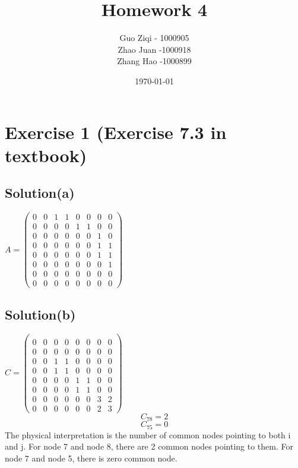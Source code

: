 \documentclass[12pt]{article}%
\begin{document}
\title{Homework 4}
\author{Guo Ziqi - 1000905\\Zhao Juan -1000918 \\Zhang Hao -1000899 }
\date{\today}
\maketitle
\section{Exercise 1 (Exercise 7.3 in textbook)}
\subsection{Solution(a)}
$A = \left(\begin{matrix} 
0&0&1&1&0&0&0&0
\\ 0&0&0&0&1&1&0&0
\\0&0&0&0&0&0&1&0
\\0&0&0&0&0&0&1&1
\\0&0&0&0&0&0&1&1
\\0&0&0&0&0&0&0&1
\\0&0&0&0&0&0&0&0
\\0&0&0&0&0&0&0&0
 \end{matrix}\right)$
\subsection{Solution(b)}
$C = \left(\begin{matrix} 
\\0&0&0&0&0&0&0&0
\\0&0&0&0&0&0&0&0
\\0&0&1&1&0&0&0&0
\\0&0&1&1&0&0&0&0
\\0&0&0&0&1&1&0&0
\\0&0&0&0&1&1&0&0
\\0&0&0&0&0&0&3&2
\\0&0&0&0&0&0&2&3
 \end{matrix}\right)$
 \[C_{78}=2\] \[C_{75}=0\] The physical interpretation is the number of common nodes pointing to both i and j. For node 7 and node 8, there are 2 common nodes pointing to them. For node 7 and node 5, there is zero common node.
\end{document}
